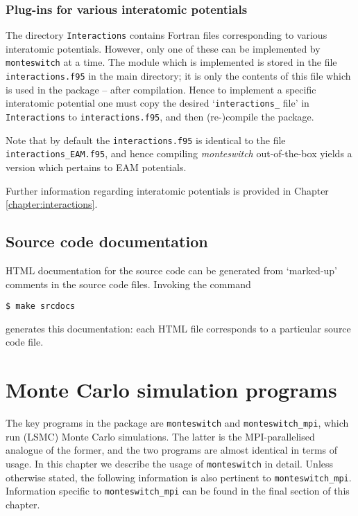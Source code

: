 \documentclass{report}
\begin{document}
\subsection{Plug-ins for various interatomic potentials}
The directory \texttt{Interactions} contains Fortran files corresponding to various interatomic potentials. However, only one of these can be implemented 
by \texttt{monteswitch} at a time. The module which is implemented is stored in the file \texttt{interactions.f95} in the main directory; it is only the 
contents of this file which is used in the package -- after compilation. Hence to implement a specific interatomic potential one must copy
the desired `\texttt{interactions\_} file' in \texttt{Interactions} to \texttt{interactions.f95}, and then (re-)compile the package.

Note that by default the \texttt{interactions.f95} is identical to the file \texttt{interactions\_EAM.f95}, and hence compiling \emph{monteswitch}
out-of-the-box yields a version which pertains to EAM potentials.

Further information regarding interatomic potentials is provided in Chapter \ref{chapter:interactions}.

\section{Source code documentation}
HTML documentation for the source code can be generated from `marked-up' comments in the source code files. Invoking the command 
\begin{verbatim}
$ make srcdocs
\end{verbatim}
generates this documentation: each HTML file corresponds to a particular source code file.


\chapter{Monte Carlo simulation programs}\label{chapter:simulation_programs}
The key programs in the package are \texttt{monteswitch} and \texttt{monteswitch\_mpi}, which run (LSMC) Monte Carlo simulations. 
The latter is the MPI-parallelised analogue of the former, and the two programs are almost identical in terms of usage.
In this chapter we describe the usage of \texttt{monteswitch} in detail. Unless otherwise stated, the following information
is also pertinent to \texttt{monteswitch\_mpi}. Information specific to \texttt{monteswitch\_mpi} can be found in 
the final section of this chapter.
\end{document}
